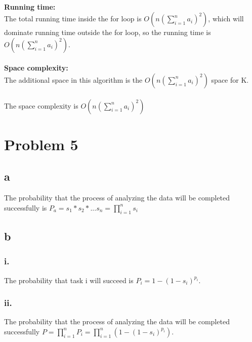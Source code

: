 \documentclass[twoside]{homework}
\begin{document}
\\\textbf{Running time:\\}
The total running time inside the for loop is  $O(n(\sum_{i=1}^{n}a_i)^2)$, which will dominate running time outside the for loop, so the running time is $O(n(\sum_{i=1}^{n}a_i)^2)$.\\
\\\textbf{Space complexity:\\}
The additional space in this algorithm is the $O(n(\sum_{i=1}^{n}a_i)^2)$ space for K.\\\\
The space complexity is $O(n(\sum_{i=1}^{n}a_i)^2)$

\section*{Problem 5}
\subsection*{a}
The probability that the process of analyzing the data will be completed successfully is $P_a=s_1*s_2*...s_n=\prod_{i=1}^n s_i$
\subsection*{b}
\subsubsection*{i.}
The probability that task i will succeed is $P_i =1- (1-s_i)^{p_i}$.
\subsubsection*{ii.}
The probability that the process of analyzing the data will be completed successfully $P = \prod_{i=1}^n P_i = \prod_{i=1}^n (1-(1-s_i)^{p_i})$.
\end{document}
